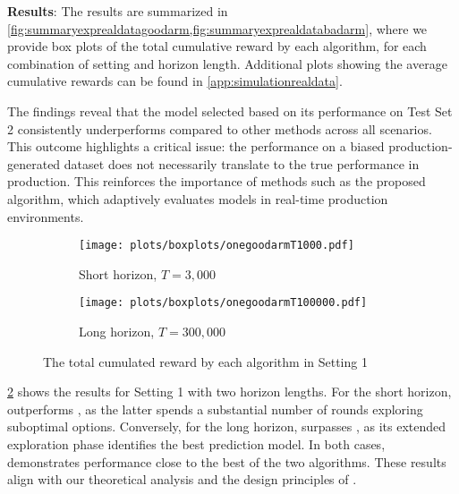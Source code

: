 \textbf{Results}: The results are summarized in \cref{fig:summaryexprealdatagoodarm,fig:summaryexprealdatabadarm}, where we provide box plots of the total cumulative reward by each algorithm, for each combination of setting and horizon length. Additional plots showing the average cumulative rewards can be found in \cref{app:simulationrealdata}.

The findings reveal that the model selected based on its performance on Test Set 2 consistently underperforms compared to other methods across all scenarios.  This outcome highlights a critical issue: the performance on a biased production-generated dataset does not necessarily translate to the true performance in production. This reinforces the importance of methods such as the proposed algorithm, which adaptively evaluates models in real-time production environments.

\begin{figure}[ht]
    \centering
    \begin{subfigure}[b]{0.8\textwidth}
        \centering
        \texttt{[image: plots/boxplots/onegoodarmT1000.pdf]} %
        \caption{Short horizon, $T=3,000$}
        \label{fig:fiboxplotonegoodarmshorthorizon}
    \end{subfigure}
    \vspace{1cm} %
    \begin{subfigure}[b]{0.8\textwidth}
        \centering
        \texttt{[image: plots/boxplots/onegoodarmT100000.pdf]} %
        \caption{Long horizon, $T=300,000$}
    \end{subfigure}
    \caption{The total cumulated reward by each algorithm in Setting 1}
    \label{fig:summaryexprealdatagoodarm}
\end{figure}


\cref{fig:summaryexprealdatagoodarm} shows the results for Setting 1 with two horizon lengths. For the short horizon, \alglcb outperforms \algucb, as the latter spends a substantial number of rounds exploring suboptimal options. Conversely, for the long horizon, \algucb surpasses \alglcb, as its extended exploration phase identifies the best prediction model. In both cases, \algoname demonstrates performance close to the best of the two algorithms. These results align with our theoretical analysis and the design principles of \algoname.

